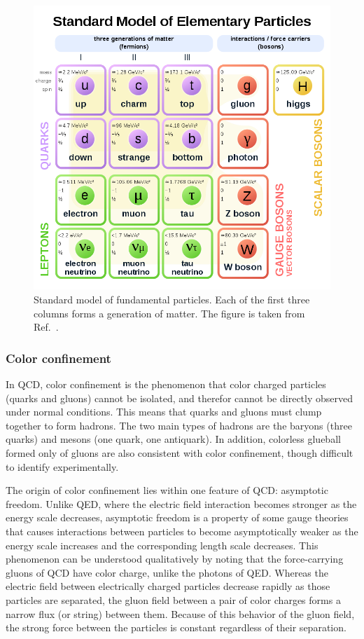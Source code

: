 \begin{figure}[H]
\centering
\includegraphics[width=.95\linewidth]{figs/chapter_intro/standard_model.png}
\caption{Standard model of fundamental particles. Each of the first three columns forms a generation of matter. The figure is taken from Ref.~\cite{wiki:standard_model}.}
\label{fig:intro_standard_model}
\end{figure}



\subsubsection{Color confinement}
\label{sec:color_confinement}

In QCD, color confinement is the phenomenon that color charged particles (quarks and gluons) cannot be isolated, and therefor cannot be directly observed under normal conditions. This means that quarks and gluons must clump together to form hadrons. The two main types of hadrons are the baryons (three quarks) and mesons (one quark, one antiquark). In addition, colorless glueball formed only of gluons are also consistent with color confinement, though difficult to identify experimentally.

The origin of color confinement lies within one feature of QCD: asymptotic freedom. Unlike QED, where the electric field interaction becomes stronger as the energy scale decreases, asymptotic freedom is a property of some gauge theories that causes interactions between particles to become asymptotically weaker as the energy scale increases and the corresponding length scale decreases. This phenomenon can be understood qualitatively by noting that the force-carrying gluons of QCD have color charge, unlike the photons of QED. Whereas the electric field between electrically charged particles decrease rapidly as those particles are separated, the gluon field between a pair of color charges forms a narrow flux (or string) between them. Because of this behavior of the gluon field, the strong force between the particles is constant regardless of their separation.

